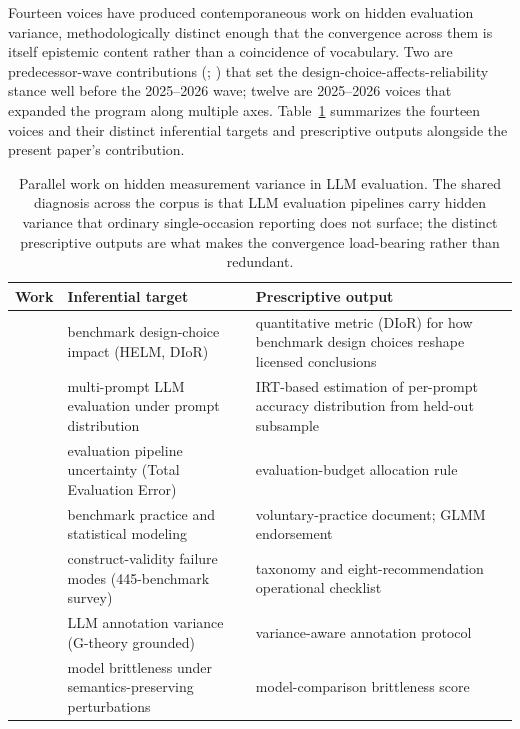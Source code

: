\documentclass[11pt]{article}
\begin{document}
Fourteen voices have produced contemporaneous work on hidden evaluation variance, methodologically distinct enough that the convergence across them is itself epistemic content rather than a coincidence of vocabulary. Two are predecessor-wave contributions (\citealt{perlitz2024efficientbenchmarking}; \citealt{polo2024promptevalUniverso}) that set the design-choice-affects-reliability stance well before the 2025--2026 wave; twelve are 2025--2026 voices that expanded the program along multiple axes. Table~\ref{tab:parallel-corpus} summarizes the fourteen voices and their distinct inferential targets and prescriptive outputs alongside the present paper's contribution.

\begin{table}[h]
\centering
\small
\caption{Parallel work on hidden measurement variance in LLM evaluation. The shared diagnosis across the corpus is that LLM evaluation pipelines carry hidden variance that ordinary single-occasion reporting does not surface; the distinct prescriptive outputs are what makes the convergence load-bearing rather than redundant.}
\label{tab:parallel-corpus}
\begin{tabular}{p{}p{}p{}}
\toprule
Work & Inferential target & Prescriptive output \\
\midrule
\citet{perlitz2024efficientbenchmarking} & benchmark design-choice impact (HELM, DIoR) & quantitative metric (DIoR) for how benchmark design choices reshape licensed conclusions \\
\citet{polo2024promptevalUniverso} & multi-prompt LLM evaluation under prompt distribution & IRT-based estimation of per-prompt accuracy distribution from held-out subsample \\
\citet{messing2026hidden} & evaluation pipeline uncertainty (Total Evaluation Error) & evaluation-budget allocation rule \\
\citet{nist2026benchmarkpractices, nist2026statmodels} & benchmark practice and statistical modeling & voluntary-practice document; GLMM endorsement \\
\citet{bean2025measuring} & construct-validity failure modes (445-benchmark survey) & taxonomy and eight-recommendation operational checklist \\
\citet{camuffo2026variance} & LLM annotation variance (G-theory grounded) & variance-aware annotation protocol \\
\citet{romanou2026brittlebench} & model brittleness under semantics-preserving perturbations & model-comparison brittleness score \\

\end{tabular}
\end{table}
\end{document}
